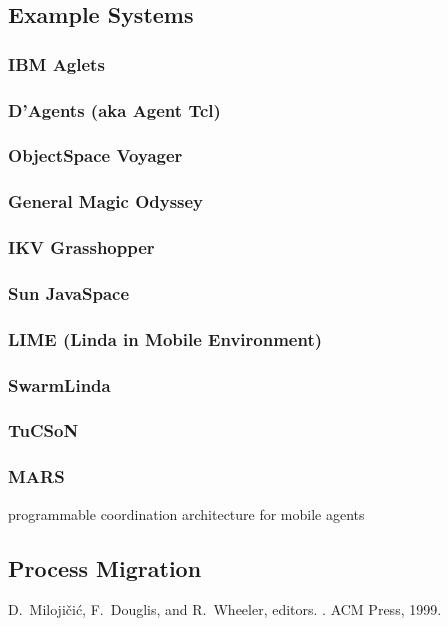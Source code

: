 \documentclass{myproc}
\begin{document}
\subsection{Example Systems}
\subsubsection{IBM Aglets}
\subsubsection{D'Agents (aka Agent Tcl)}
\subsubsection{ObjectSpace Voyager}
\subsubsection{General Magic Odyssey}
\subsubsection{IKV Grasshopper}
\subsubsection{Sun JavaSpace}
\subsubsection{LIME (Linda in Mobile Environment)}
\subsubsection{SwarmLinda}
\subsubsection{TuCSoN}
\subsubsection{MARS}
\bit
\w programmable coordination architecture for mobile agents
\eit


\subsection{Process Migration}
\bit
\w D.~Miloji\v{c}i\'{c}, F.~Douglis, and R.~Wheeler, editors.
.
\newblock ACM Press, 1999.
\end{document}
